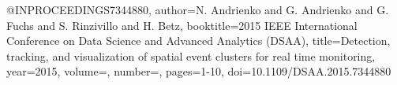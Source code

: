 @INPROCEEDINGS{7344880,
  author={N. {Andrienko} and G. {Andrienko} and G. {Fuchs} and S. {Rinzivillo} and H. {Betz}},
  booktitle={2015 IEEE International Conference on Data Science and Advanced Analytics (DSAA)}, 
  title={Detection, tracking, and visualization of spatial event clusters for real time monitoring}, 
  year={2015},
  volume={},
  number={},
  pages={1-10},
  doi={10.1109/DSAA.2015.7344880}}